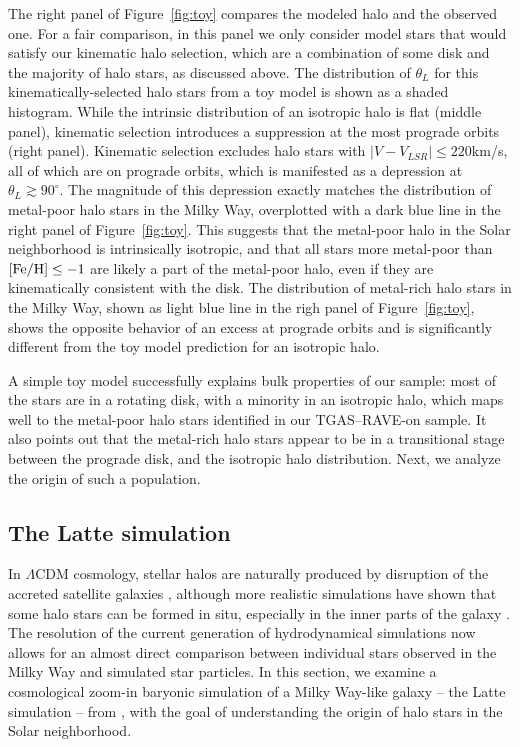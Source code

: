 \documentclass[apj, twocolappendix, numberedappendix, appendixfloats]{emulateapj}
\begin{document}
The right panel of Figure~\ref{fig:toy} compares the modeled halo and the observed one.
For a fair comparison, in this panel we only consider model stars that would satisfy our kinematic halo selection, which are a combination of some disk and the majority of halo stars, as discussed above.
The distribution of $\theta_L$ for this kinematically-selected halo stars from a toy model is shown as a shaded histogram.
While the intrinsic distribution of an isotropic halo is flat (middle panel), kinematic selection introduces a suppression at the most prograde orbits (right panel).
Kinematic selection excludes halo stars with $|V-V_{LSR}|\leq220$\;km/s, all of which are on prograde orbits, which is manifested as a depression at $\theta_L\gtrsim90^\circ$.
The magnitude of this depression exactly matches the distribution of metal-poor halo stars in the Milky Way, overplotted with a dark blue line in the right panel of Figure~\ref{fig:toy}.
This suggests that the metal-poor halo in the Solar neighborhood is intrinsically isotropic, and that all stars more metal-poor than $\rm[Fe/H]\leq-1$ are likely a part of the metal-poor halo, even if they are kinematically consistent with the disk.
The distribution of metal-rich halo stars in the Milky Way, shown as light blue line in the righ panel of Figure~\ref{fig:toy}, shows the opposite behavior of an excess at prograde orbits and is significantly different from the toy model prediction for an isotropic halo.

A simple toy model successfully explains bulk properties of our sample: most of the stars are in a rotating disk, with a minority in an isotropic halo, which maps well to the metal-poor halo stars identified in our TGAS--RAVE-on sample.
It also points out that the metal-rich halo stars appear to be in a transitional stage between the prograde disk, and the isotropic halo distribution.
Next, we analyze the origin of such a population.

\subsection{The Latte simulation}
\label{sec:latte}
In $\Lambda$CDM cosmology, stellar halos are naturally produced by disruption of the accreted satellite galaxies \citep[e.g.,][]{bj2005, johnston2008}, although more realistic simulations have shown that some halo stars can be formed in situ, especially in the inner parts of the galaxy \citep[e.g.,][]{zolotov2009}.
The resolution of the current generation of hydrodynamical simulations now allows for an almost direct comparison between individual stars observed in the Milky Way and simulated star particles.
In this section, we examine a cosmological zoom-in baryonic simulation of a Milky Way-like galaxy -- the Latte simulation -- from \citet{wetzel2016}, with the goal of understanding the origin of halo stars in the Solar neighborhood.
\end{document}

